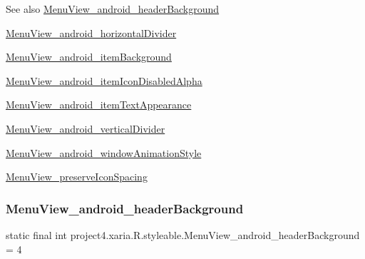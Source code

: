 \begin{DoxySeeAlso}{See also}
\hyperlink{classproject4_1_1xaria_1_1R_1_1styleable_a1c95fec75ad396df1e8fe40acc009779}{Menu\+View\+\_\+android\+\_\+header\+Background} 

\hyperlink{classproject4_1_1xaria_1_1R_1_1styleable_ac8dce77f204832af3ea731716ca38877}{Menu\+View\+\_\+android\+\_\+horizontal\+Divider} 

\hyperlink{classproject4_1_1xaria_1_1R_1_1styleable_a2571658608ce1d5d8a959d3f06dc952d}{Menu\+View\+\_\+android\+\_\+item\+Background} 

\hyperlink{classproject4_1_1xaria_1_1R_1_1styleable_a33cd80d140efb3245ac24e8c44d445d0}{Menu\+View\+\_\+android\+\_\+item\+Icon\+Disabled\+Alpha} 

\hyperlink{classproject4_1_1xaria_1_1R_1_1styleable_a3d955c47903c9650c0f2722cc42904cb}{Menu\+View\+\_\+android\+\_\+item\+Text\+Appearance} 

\hyperlink{classproject4_1_1xaria_1_1R_1_1styleable_ac550192a3b9eed5ec97313a89b3f93b9}{Menu\+View\+\_\+android\+\_\+vertical\+Divider} 

\hyperlink{classproject4_1_1xaria_1_1R_1_1styleable_ab594d20426da891ee4202ce7515875cd}{Menu\+View\+\_\+android\+\_\+window\+Animation\+Style} 

\hyperlink{classproject4_1_1xaria_1_1R_1_1styleable_a49472a6360fcdd0f2b8713f71f079e51}{Menu\+View\+\_\+preserve\+Icon\+Spacing} 
\end{DoxySeeAlso}
\mbox{\label{classproject4_1_1xaria_1_1R_1_1styleable_a1c95fec75ad396df1e8fe40acc009779}} 
\subsubsection{\texorpdfstring{Menu\+View\+\_\+android\+\_\+header\+Background}{MenuView\_android\_headerBackground}}
{\footnotesize\ttfamily static final int project4.\+xaria.\+R.\+styleable.\+Menu\+View\+\_\+android\+\_\+header\+Background = 4\hspace{0.3cm}{\ttfamily [static]}}

